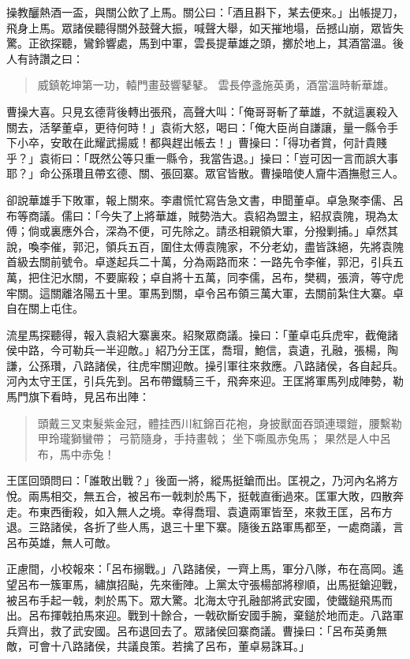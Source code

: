 操教釃熱酒一盃，與關公飲了上馬。關公曰：「酒且斟下，某去便來。」出帳提刀，飛身上馬。眾諸侯聽得關外鼓聲大振，喊聲大舉，如天摧地塌，岳撼山崩，眾皆失驚。正欲探聽，鸞鈴響處，馬到中軍，雲長提華雄之頭，擲於地上，其酒當溫。後人有詩讚之曰：

\begin{quote}
威鎮乾坤第一功，轅門畫鼓響鼕鼕。
雲長停盞施英勇，酒當溫時斬華雄。
\end{quote}

曹操大喜。只見玄德背後轉出張飛，高聲大叫：「俺哥哥斬了華雄，不就這裏殺入關去，活拏董卓，更待何時！」袁術大怒，喝曰：「俺大臣尚自謙讓，量一縣令手下小卒，安敢在此耀武揚威！都與趕出帳去！」曹操曰：「得功者賞，何計貴賤乎？」袁術曰：「既然公等只重一縣令，我當告退。」操曰：「豈可因一言而誤大事耶？」命公孫瓚且帶玄德、關、張回寨。眾官皆散。曹操暗使人齎牛酒撫慰三人。

卻說華雄手下敗軍，報上關來。李肅慌忙寫告急文書，申聞董卓。卓急聚李儒、呂布等商議。儒曰：「今失了上將華雄，賊勢浩大。袁紹為盟主，紹叔袁隗，現為太傅；倘或裏應外合，深為不便，可先除之。請丞相親領大軍，分撥剿捕。」卓然其說，喚李催，郭汜，領兵五百，圍住太傅袁隗家，不分老幼，盡皆誅絕，先將袁隗首級去關前號令。卓遂起兵二十萬，分為兩路而來：一路先令李催，郭汜，引兵五萬，把住汜水關，不要廝殺；卓自將十五萬，同李儒，呂布，樊稠，張濟，等守虎牢關。這關離洛陽五十里。軍馬到關，卓令呂布領三萬大軍，去關前紮住大寨。卓自在關上屯住。

流星馬探聽得，報入袁紹大寨裏來。紹聚眾商議。操曰：「董卓屯兵虎牢，截俺諸侯中路，今可勒兵一半迎敵。」紹乃分王匡，喬瑁，鮑信，袁遺，孔融，張楊，陶謙，公孫瓚，八路諸侯，往虎牢關迎敵。操引軍往來救應。八路諸侯，各自起兵。河內太守王匡，引兵先到。呂布帶鐵騎三千，飛奔來迎。王匡將軍馬列成陣勢，勒馬門旗下看時，見呂布出陣：

\begin{quote}
頭戴三叉束髮紫金冠，體挂西川紅錦百花袍，身披獸面吞頭連環鎧，腰繫勒甲玲瓏獅蠻帶；
弓箭隨身，手持畫戟；
坐下嘶風赤兔馬；
果然是人中呂布，馬中赤兔！
\end{quote}

王匡回頭問曰：「誰敢出戰？」後面一將，縱馬挺鎗而出。匡視之，乃河內名將方悅。兩馬相交，無五合，被呂布一戟刺於馬下，挺戟直衝過來。匡軍大敗，四散奔走。布東西衝殺，如入無人之境。幸得喬瑁、袁遺兩軍皆至，來救王匡，呂布方退。三路諸侯，各折了些人馬，退三十里下寨。隨後五路軍馬都至，一處商議，言呂布英雄，無人可敵。

正慮間，小校報來：「呂布搦戰。」八路諸侯，一齊上馬，軍分八隊，布在高岡。遙望呂布一簇軍馬，繡旗招颭，先來衝陣。上黨太守張楊部將穆順，出馬挺鎗迎戰，被呂布手起一戟，刺於馬下。眾大驚。北海太守孔融部將武安國，使鐵鎚飛馬而出。呂布揮戟拍馬來迎。戰到十餘合，一戟砍斷安國手腕，棄鎚於地而走。八路軍兵齊出，救了武安國。呂布退回去了。眾諸侯回寨商議。曹操曰：「呂布英勇無敵，可會十八路諸侯，共議良策。若擒了呂布，董卓易誅耳。」

